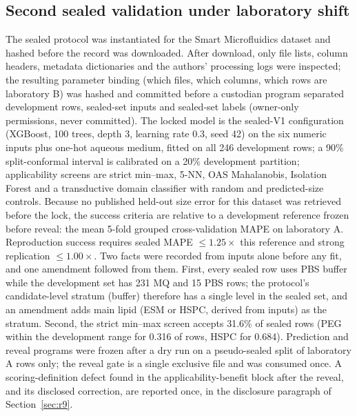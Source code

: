 \documentclass[11pt,a4paper]{article}
\begin{document}
\subsection{Second sealed validation under laboratory shift}
\label{sec:d3protocol}
The sealed protocol was instantiated for the Smart Microfluidics dataset and
hashed before the record was downloaded. After download, only file lists,
column headers, metadata dictionaries and the authors' processing logs were
inspected; the resulting parameter binding (which files, which columns,
which rows are laboratory B) was hashed and committed before a custodian
program separated development rows, sealed-set inputs and sealed-set labels
(owner-only permissions, never committed). The locked model is the sealed-V1 configuration
(XGBoost, 100 trees, depth 3, learning rate 0.3, seed 42) on the six numeric
inputs plus one-hot aqueous medium, fitted on all 246 development rows; a 90\%
split-conformal interval is calibrated on a 20\% development partition;
applicability screens are strict min--max, 5-NN, OAS Mahalanobis, Isolation
Forest and a transductive domain classifier with random and predicted-size
controls. Because no published held-out size error for this dataset was
retrieved before the lock, the success criteria are relative to a
development reference frozen before reveal: the mean 5-fold grouped
cross-validation MAPE on laboratory A. Reproduction success requires sealed
MAPE $\le 1.25\times$ this reference and strong replication $\le 1.00\times$.
Two facts were recorded from inputs alone before any fit, and one amendment
followed from them. First, every sealed row uses PBS buffer while the
development set has 231 MQ and 15 PBS rows; the protocol's candidate-level
stratum (buffer) therefore has a single level in the sealed set, and an
amendment adds main lipid (ESM or HSPC, derived from inputs) as the stratum.
Second, the strict min--max screen accepts 31.6\% of sealed rows (PEG within
the development range for 0.316 of rows, HSPC for 0.684). Prediction and
reveal programs were frozen after a dry run on a pseudo-sealed split of
laboratory A rows only; the reveal gate is a single exclusive file and was
consumed once. A scoring-definition defect found in the applicability-benefit
block after the reveal, and its disclosed correction, are reported once, in
the disclosure paragraph of Section~\ref{sec:r9}.
\end{document}
